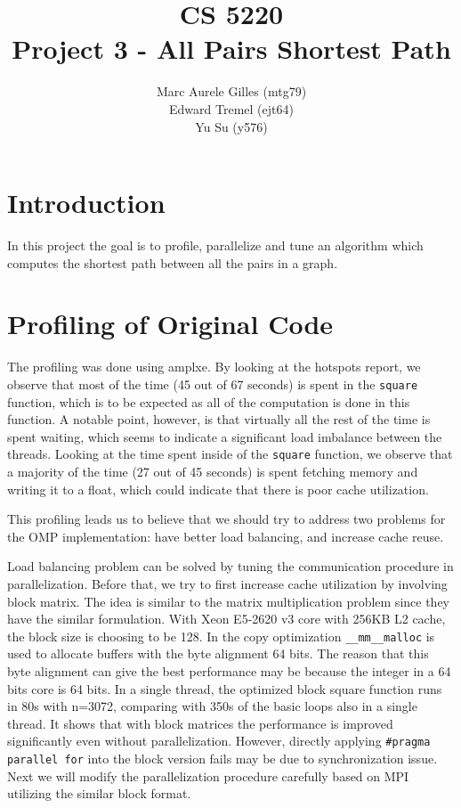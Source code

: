 \documentclass[11pt]{article}
\begin{document}
\title{CS 5220\\ Project 3 - All Pairs Shortest Path}
\author{Marc Aurele Gilles (mtg79)\\ Edward Tremel (ejt64) \\ Yu Su (y576)}
\maketitle

\section{Introduction}
In this project the goal is to profile, parallelize and tune an algorithm which computes the shortest path between all the pairs in a graph.


\section{Profiling of Original Code}
The profiling was done using amplxe. By looking at the hotspots report, we observe that most of the time (45 out of 67 seconds) is spent in the \texttt{square} function, which is to be expected as all of the computation is done in this function. A notable point, however, is that virtually all the rest of the time is spent waiting, which seems to indicate a significant load imbalance between the threads.
Looking at the time spent inside of the \texttt{square} function, we observe that a majority of the time (27 out of 45 seconds) is spent fetching memory and writing it to a float, which could indicate that there is poor cache utilization.

This profiling leads us to believe that we should try to address two problems for the OMP implementation: have better load balancing, and increase cache reuse.

Load balancing problem can be solved by tuning the communication procedure in parallelization. Before that, we try to first increase cache utilization by involving block matrix. The idea is similar to the matrix multiplication problem since they have the similar formulation. With Xeon E5-2620 v3 core with 256KB L2 cache, the block size is choosing to be 128. In the copy optimization \texttt{\_\_mm\_\_malloc} is used to allocate buffers with the byte alignment 64 bits. The reason that this byte alignment can give the best performance may be because the integer in a 64 bits core is 64 bits. In a single thread, the optimized block square function runs in 80s with n=3072, comparing with 350s of the basic loops also in a single thread. It shows that with block matrices the performance is improved significantly even without parallelization. However, directly applying \texttt{\#pragma parallel for} into the block version fails may be due to synchronization issue. Next we will modify the parallelization procedure carefully based on MPI utilizing the similar block format.
\end{document}
